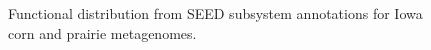 \documentclass[11pt]{article} %
\begin{document}
\begin{figure}[ht]
\caption{Functional distribution from SEED subsystem annotations for
  Iowa corn and prairie metagenomes.}
\label{subsystem}
\end{figure}
\end{document}
